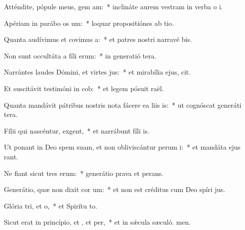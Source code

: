 \item Atténdite, pópule meus, gem am:~* inclináte aurem vestram in verba o i.
\item Apériam in parábo os um:~* loquar propositiónes ab tio.
\item Quanta audívimus et covimus a:~* et patres nostri narravé bis.
\item Non sunt occultáta a fíli erum:~* in generatió tera.
\item Narrántes laudes Dómini, et virtes jus:~* et mirabília ejus,  cit.
\item Et suscitávit testimóni in cob:~* et legem pósuit  raël.
\item Quanta mandávit pátribus nostris nota fácere ea liis is:~* ut cognóscat generáti tera.
\item Fílii qui nascéntur,  exgent,~* et narrábunt fíli is.
\item Ut ponant in Deo spem suam, et non obliviscántur perum i:~* et mandáta ejus rant.
\item Ne fiant sicut tres erum:~* generátio prava et perans.
\item Generátio, quæ non dixit cor um:~* et non est créditus cum Deo spíri jus.
\item Glória tri, et o,~* et Spirítu to.
\item Sicut erat in princípio, et , et per,~* et in sǽcula sæculó. men.
